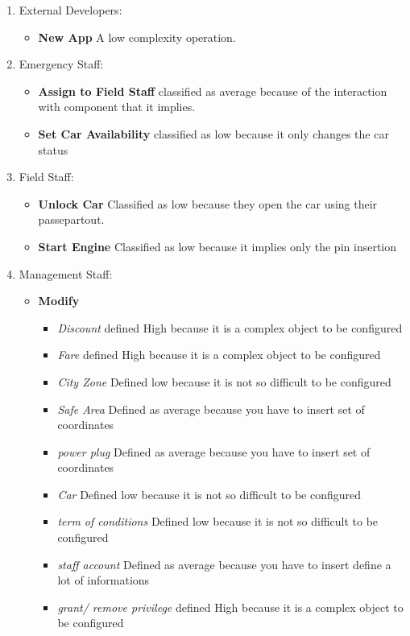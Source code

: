 \documentclass[english]{article}
\begin{document}
\begin{enumerate}
\begin{itemize}
\end{itemize}
\item External Developers:
\begin{itemize}
\item \textbf{New App} A low complexity operation. 
\end{itemize}
\item Emergency Staff:
\begin{itemize}
\item \textbf{Assign to Field Staff} classified as average because of the interaction with component that it implies.
\item \textbf{Set Car Availability} classified as low because it only changes the car status
\end{itemize}
\item Field Staff:
\begin{itemize}
\item \textbf{Unlock Car} Classified as low because they open the car using their passepartout.
\item \textbf{Start Engine} Classified as low because it implies only the pin insertion
\end{itemize}
\item Management Staff:
\begin{itemize}
\item \textbf{Modify}
	\begin{itemize}
	\item\textit{Discount} defined High because it is a complex object to be  configured
	\item \textit{Fare} defined High because it is a complex object to be  configured
	\item \textit{City Zone} Defined low because it is not so difficult to be configured
	\item \textit{Safe Area} Defined as average because you have to insert set of coordinates
	\item \textit{power plug} Defined as average because you have to insert set of coordinates
	\item \textit{Car}  Defined low because it is not so difficult to be configured 
	\item \textit{term of conditions}  Defined low because it is not so difficult to be configured
	\item \textit{staff account} Defined as average because you have to insert define a lot of informations
	\item \textit{grant/ remove privilege}  defined  High because it is a complex object to be configured
	\end{itemize}
\end{itemize}
\end{enumerate}
\end{document}
